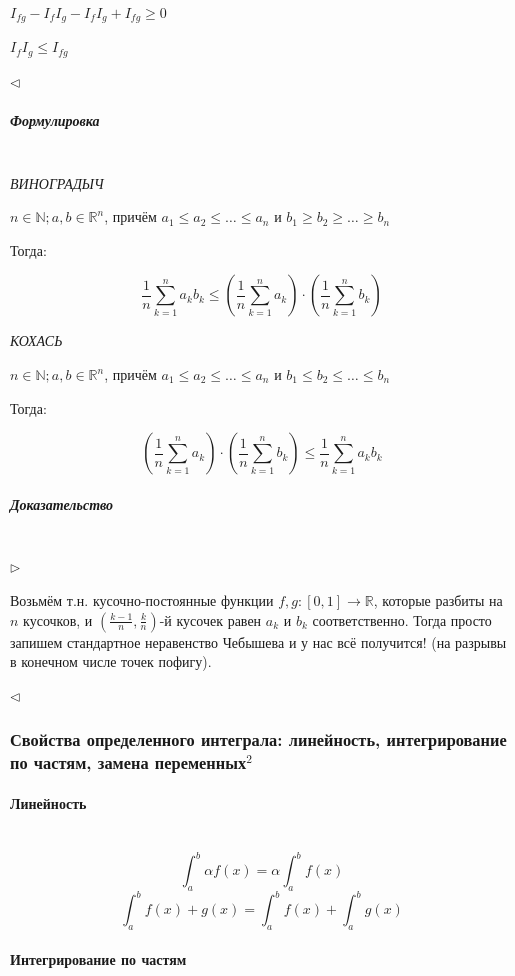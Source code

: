 \documentclass{article}
\let\vanillaparagraph\paragraph
\let\vanillasubparagraph\subparagraph
\renewcommand{\paragraph}[1]{\vanillaparagraph{#1}\mbox{}\\}
\renewcommand{\subparagraph}[1]{\vanillasubparagraph{#1}\mbox{}\\}
\begin{document}
$I_{fg} - I_fI_g - I_fI_g + I_{fg} \ge 0$

$I_fI_g \le I_{fg}$

$\lhd$


\subparagraph{Формулировка}

\textit{ВИНОГРАДЫЧ}

$n \in \mathbb{N}; a, b \in \mathbb{R}^n$, причём $a_1 \le a_2 \le \ldots \le a_n$ и $b_1 \ge b_2 \ge \ldots \ge b_n$

Тогда:

\[\frac{1}{n}\sum_{k = 1}^n{a_kb_k} \le \left(\frac{1}{n}\sum_{k = 1}^n{a_k}\right) \cdot \left(\frac{1}{n}\sum_{k = 1}^n{b_k}\right)\]

\textit{КОХАСЬ}

$n \in \mathbb{N}; a, b \in \mathbb{R}^n$, причём $a_1 \le a_2 \le \ldots \le a_n$ и $b_1 \le b_2 \le \ldots \le b_n$

Тогда:

\[\left(\frac{1}{n}\sum_{k = 1}^n{a_k}\right) \cdot \left(\frac{1}{n}\sum_{k = 1}^n{b_k}\right) \le \frac{1}{n}\sum_{k = 1}^n{a_kb_k} \]


\subparagraph{Доказательство}

$\rhd$

Возьмём т.н. кусочно-постоянные функции $f, g: [0, 1] \rightarrow \mathbb{R}$, которые разбиты на $n$ кусочков, и $\left(\frac{k - 1}{n}, \frac{k}{n}\right)$-й кусочек равен $a_k$ и $b_k$ соответственно. Тогда просто запишем стандартное неравенство Чебышева и у нас всё получится! (на разрывы в конечном числе точек пофигу).

$\lhd$


\subsubsection{Свойства определенного интеграла: линейность, интегрирование по частям, замена переменных\texorpdfstring{$^2$}{}}

\paragraph{Линейность}

\[\int_a^b{\alpha f(x)} = \alpha \int_a^b{f(x)}\]
\[\int_a^b{f(x) + g(x)} = \int_a^b{f(x)} + \int_a^b{g(x)}\]


\paragraph{Интегрирование по частям}
\end{document}
